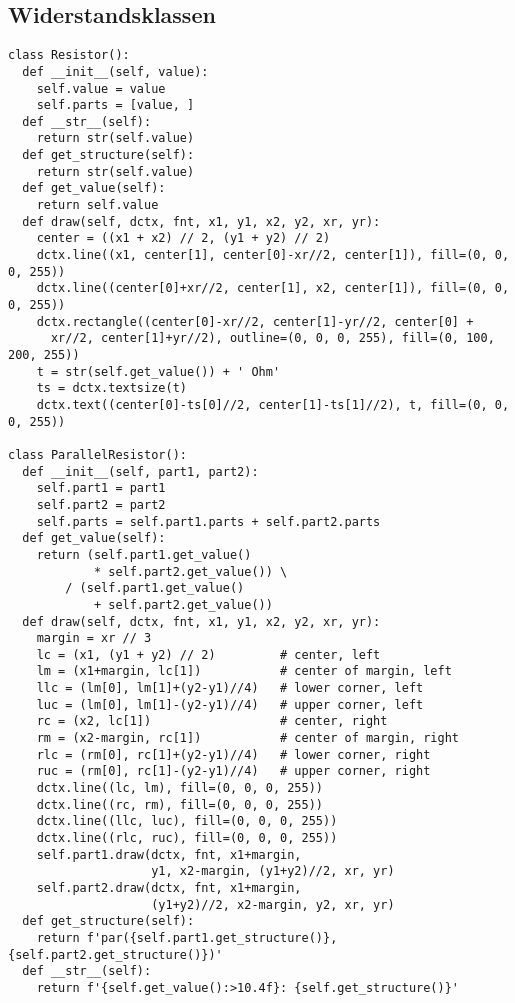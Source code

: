\documentclass[a4paper,10pt,ngerman]{scrartcl}
\begin{document}
\subsection{Widerstandsklassen}
\begin{lstlisting}[frame=single]
class Resistor():      
  def __init__(self, value):    
    self.value = value
    self.parts = [value, ]
  def __str__(self):
    return str(self.value)
  def get_structure(self):
    return str(self.value)
  def get_value(self):
    return self.value
  def draw(self, dctx, fnt, x1, y1, x2, y2, xr, yr):
    center = ((x1 + x2) // 2, (y1 + y2) // 2)
    dctx.line((x1, center[1], center[0]-xr//2, center[1]), fill=(0, 0, 0, 255))
    dctx.line((center[0]+xr//2, center[1], x2, center[1]), fill=(0, 0, 0, 255))
    dctx.rectangle((center[0]-xr//2, center[1]-yr//2, center[0] +
      xr//2, center[1]+yr//2), outline=(0, 0, 0, 255), fill=(0, 100, 200, 255))
    t = str(self.get_value()) + ' Ohm'
    ts = dctx.textsize(t)
    dctx.text((center[0]-ts[0]//2, center[1]-ts[1]//2), t, fill=(0, 0, 0, 255))

class ParallelResistor():
  def __init__(self, part1, part2):
    self.part1 = part1
    self.part2 = part2
    self.parts = self.part1.parts + self.part2.parts 
  def get_value(self):                                 
    return (self.part1.get_value()
            * self.part2.get_value()) \
        / (self.part1.get_value()
            + self.part2.get_value())                
  def draw(self, dctx, fnt, x1, y1, x2, y2, xr, yr):
    margin = xr // 3
    lc = (x1, (y1 + y2) // 2)         # center, left
    lm = (x1+margin, lc[1])           # center of margin, left
    llc = (lm[0], lm[1]+(y2-y1)//4)   # lower corner, left
    luc = (lm[0], lm[1]-(y2-y1)//4)   # upper corner, left
    rc = (x2, lc[1])                  # center, right
    rm = (x2-margin, rc[1])           # center of margin, right
    rlc = (rm[0], rc[1]+(y2-y1)//4)   # lower corner, right
    ruc = (rm[0], rc[1]-(y2-y1)//4)   # upper corner, right
    dctx.line((lc, lm), fill=(0, 0, 0, 255))
    dctx.line((rc, rm), fill=(0, 0, 0, 255))
    dctx.line((llc, luc), fill=(0, 0, 0, 255))
    dctx.line((rlc, ruc), fill=(0, 0, 0, 255))
    self.part1.draw(dctx, fnt, x1+margin,
                    y1, x2-margin, (y1+y2)//2, xr, yr)
    self.part2.draw(dctx, fnt, x1+margin,
                    (y1+y2)//2, x2-margin, y2, xr, yr)
  def get_structure(self):
    return f'par({self.part1.get_structure()}, {self.part2.get_structure()})'
  def __str__(self):
    return f'{self.get_value():>10.4f}: {self.get_structure()}'


\end{lstlisting}
\end{document}

